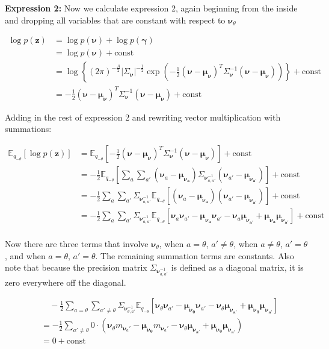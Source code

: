 \documentclass[letterpaper,12pt]{article}
\newcommand{\lc}{\left \{} %
\newcommand{\rc}{\right \}} %
\newcommand{\lp}{\left (} %
\newcommand{\rp}{\right )} %
\newcommand{\lb}{\left [} %
\newcommand{\rb}{\right ]} %
\newcommand{\pz}{\ensuremath{p(\boldsymbol{z})}}
\newcommand{\nuv}{\boldsymbol{\nu}} %
\newcommand{\gammav}{\boldsymbol{\gamma}} %
\newcommand{\meannu}{\ensuremath{\boldsymbol{\mu_\nuv}}} %
\newcommand{\Sigmanu}{\Sigma_{\nuv}} %
\newcommand{\nua}{\ensuremath{\nuv_a}} %
\newcommand{\nuaprime}{\ensuremath{\nuv_{a'}}} %
\newcommand{\meananu}{\ensuremath{\boldsymbol{\mu_{\nuv_a}}}} %
\newcommand{\meanaprimenu}{\ensuremath{\boldsymbol{\mu_{\nuv_{a'}}}}} %
\newcommand{\nutheta}{\ensuremath{\nuv_\theta}} %
\newcommand{\meannutheta}{\ensuremath{\boldsymbol{\mu_{\nuv_\theta}}}} %
\newcommand{\mnusub}[1]{\ensuremath{m_{\nuv_#1}}} %
\newcommand{\Etheta}{\ensuremath{\mathbb{E}_{q_{-\theta}}}} %
\newcommand{\el}{\left[} %
\newcommand{\er}{\right]} %
\begin{document}
\noindent \textbf{Expression 2:} Now we calculate expression 2, again beginning from the inside and dropping all variables that are constant with respect to $\nutheta$

\begin{equation}
\begin{split}
    \log \pz &= \log p(\nuv) + \log p(\gammav) \\
    &= \log p(\nuv) + \text{const} \\
    &= \log \lc \lp 2 \pi \rp ^{-\frac{A}{2}} | \Sigmanu |^{-\frac{1}{2}} \exp \lp - \frac{1}{2} \lp \nuv - \meannu \rp^T \Sigmanu^{-1} \lp \nuv - \meannu \rp \rp \rc + \text{const} \\
    &= - \frac{1}{2} \lp \nuv - \meannu \rp^T \Sigmanu^{-1} \lp \nuv - \meannu \rp + \text{const}
\end{split}
\end{equation}

Adding in the rest of expression 2 and rewriting vector multiplication with summations:

\begin{equation}
\begin{split}
    \Etheta \el \log \pz \er &= \Etheta \el - \frac{1}{2} \lp \nuv - \meannu \rp^T \Sigmanu^{-1} \lp \nuv - \meannu \rp \er + \text{const} \\
    &= -\frac{1}{2} \Etheta \lb \sum_a \sum_{a'} \lp \nua - \meananu \rp \Sigmanu_{a,a'}^{-1} \lp \nuaprime - \meanaprimenu \rp \rb + \text{const} \\
    &= - \frac{1}{2} \sum_a \sum_{a'}  \Sigmanu_{a,a'}^{-1} \Etheta  \lb \lp \nua - \meananu \rp \lp \nuaprime - \meanaprimenu \rp \rb + \text{const} \\
    &= - \frac{1}{2} \sum_a \sum_{a'}  \Sigmanu_{a,a'}^{-1} \Etheta  \lb \nua \nuaprime - \meananu\nuaprime - \nua \meanaprimenu + \meananu \meanaprimenu \rb + \text{const} \\
\end{split}
\end{equation}

Now there are three terms that involve $\nutheta$, when $a=\theta$, $a' \neq \theta$, when $a \neq \theta$, $a' = \theta$, and when $a=\theta$, $a'=\theta$. The remaining summation terms are constants. Also note that because the precision matrix $\Sigmanu_{a,a'}^{-1}$ is defined as a diagonal matrix, it is zero everywhere off the diagonal.

\begin{equation}
\begin{split}
    & \quad - \frac{1}{2} \sum_{a=\theta} \sum_{a' \neq \theta}  \Sigmanu_{\theta,a'}^{-1} \Etheta  \lb \nutheta \nuaprime - \meannutheta \nuaprime - \nutheta \meanaprimenu + \meannutheta \meanaprimenu \rb \\
    &= - \frac{1}{2} \sum_{a' \neq \theta} 0 \cdot  \lp \nutheta \mnusub{a'} - \meannutheta \mnusub{a'} - \nutheta \meanaprimenu + \meannutheta \meanaprimenu \rp \\
    &= 0 + \textrm{const}
\end{split}
\end{equation}
\end{document}
